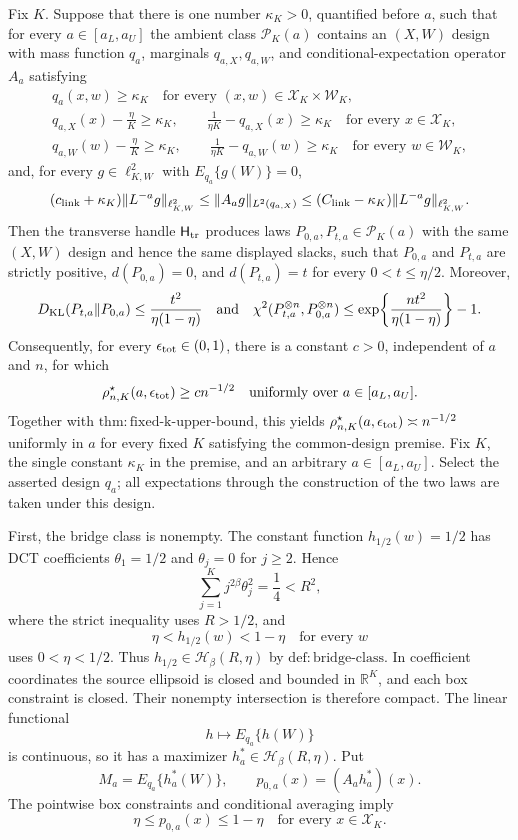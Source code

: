 Fix \(K\).  Suppose that there is one number \(\kappa_K>0\), quantified before \(a\), such that for every \(a\in[a_L,a_U]\) the ambient class \(\mathcal P_K(a)\) contains an \((X,W)\) design with mass function \(q_a\), marginals \(q_{a,X},q_{a,W}\), and conditional-expectation operator \(A_a\) satisfying
\[
\begin{gathered}
q_a(x,w)\ge \kappa_K\quad\text{for every }(x,w)\in\mathcal X_K\times\mathcal W_K,\\
q_{a,X}(x)-\frac{\eta}{K}\ge\kappa_K,
\qquad \frac{1}{\eta K}-q_{a,X}(x)\ge\kappa_K
\quad\text{for every }x\in\mathcal X_K,\\
q_{a,W}(w)-\frac{\eta}{K}\ge\kappa_K,
\qquad \frac{1}{\eta K}-q_{a,W}(w)\ge\kappa_K
\quad\text{for every }w\in\mathcal W_K,
\end{gathered}
\]
and, for every \(g\in\ell^2_{K,W}\) with \(E_{q_a}\{g(W)\}=0\),
\[
(c_{\rm link}+\kappa_K)\|L^{-a}g\|_{\ell^2_{K,W}}
\le \|A_ag\|_{L^2(q_{a,X})}
\le (C_{\rm link}-\kappa_K)\|L^{-a}g\|_{\ell^2_{K,W}}.
\]
Then the transverse handle \(\mathsf H_{\rm tr}\) produces laws \(P_{0,a},P_{t,a}\in\mathcal P_K(a)\) with the same \((X,W)\) design and hence the same displayed slacks, such that \(P_{0,a}\) and \(P_{t,a}\) are strictly positive, \(d(P_{0,a})=0\), and \(d(P_{t,a})=t\) for every \(0<t\le\eta/2\).  Moreover,
\[
D_{\rm KL}(P_{t,a}\|P_{0,a})\le\frac{t^2}{\eta(1-\eta)}
\quad\text{and}\quad
\chi^2(P_{t,a}^{\otimes n},P_{0,a}^{\otimes n})
\le \exp\!\left\{\frac{nt^2}{\eta(1-\eta)}\right\}-1.
\]
Consequently, for every \(\epsilon_{\rm tot}\in(0,1)\), there is a constant \(c>0\), independent of \(a\) and \(n\), for which
\[
\rho^\star_{n,K}(a,\epsilon_{\rm tot})\ge c n^{-1/2}
\quad\text{uniformly over }a\in[a_L,a_U].
\]
Together with \(\mathrm{thm:fixed\mbox{-}k\mbox{-}upper\mbox{-}bound}\), this yields \(\rho^\star_{n,K}(a,\epsilon_{\rm tot})\asymp n^{-1/2}\) uniformly in \(a\) for every fixed \(K\) satisfying the common-design premise.
Fix \(K\), the single constant \(\kappa_K\) in the premise, and an arbitrary \(a\in[a_L,a_U]\).  Select the asserted design \(q_a\); all expectations through the construction of the two laws are taken under this design.

First, the bridge class is nonempty.  The constant function \(h_{1/2}(w)=1/2\) has DCT coefficients \(\theta_1=1/2\) and \(\theta_j=0\) for \(j\ge2\).  Hence
\[
\sum_{j=1}^K j^{2\beta}\theta_j^2=\frac14<R^2,
\]
where the strict inequality uses \(R>1/2\), and
\[
\eta<h_{1/2}(w)<1-\eta\quad\text{for every }w
\]
uses \(0<\eta<1/2\).  Thus \(h_{1/2}\in\mathcal H_\beta(R,\eta)\) by \(\mathrm{def:bridge\mbox{-}class}\).  In coefficient coordinates the source ellipsoid is closed and bounded in \(\mathbb R^K\), and each box constraint is closed.  Their nonempty intersection is therefore compact.  The linear functional
\[
h\longmapsto E_{q_a}\{h(W)\}
\]
is continuous, so it has a maximizer \(h_a^*\in\mathcal H_\beta(R,\eta)\).  Put
\[
M_a=E_{q_a}\{h_a^*(W)\},
\qquad p_{0,a}(x)=(A_ah_a^*)(x).
\]
The pointwise box constraints and conditional averaging imply
\[
\eta\le p_{0,a}(x)\le1-\eta
\quad\text{for every }x\in\mathcal X_K. \tag{1}
\]

